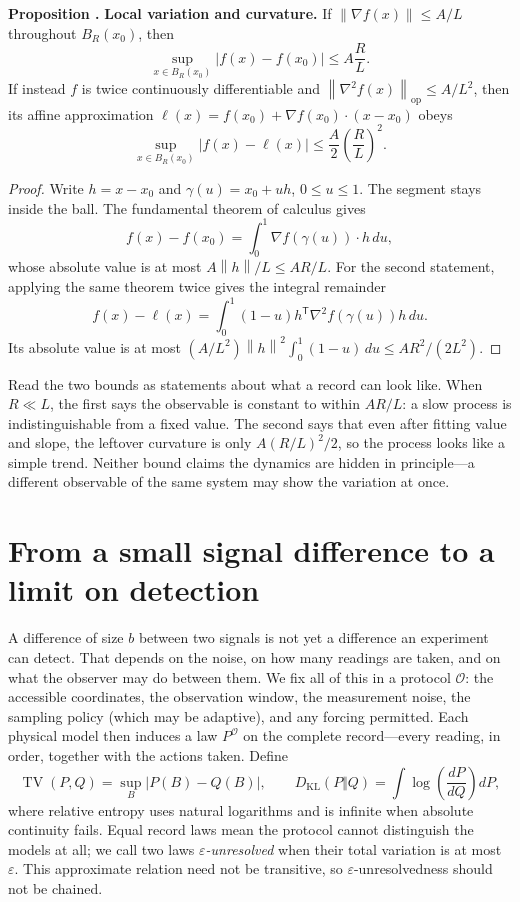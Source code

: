 \documentclass[10pt]{article}
\newcounter{claim}
\newcommand{\claim}[2]{\refstepcounter{claim}\label{#1}\textbf{#2 \theclaim.}}
\newcommand{\TV}{\operatorname{TV}}
\newcommand{\KL}{D_{\mathrm{KL}}}
\newcommand{\eps}{\varepsilon}
\newcommand{\obs}{\mathcal O}
\newcommand{\norm}[1]{\left\lVert#1\right\rVert}
\begin{document}
\begin{resultbox}
\claim{prop:geometry}{Proposition} \textbf{Local variation and curvature.}
If $\norm{\nabla f(x)}\leq A/L$ throughout $B_R(x_0)$, then
\begin{equation}
\sup_{x\in B_R(x_0)}|f(x)-f(x_0)|\leq A\frac RL.
\label{eq:gradient}
\end{equation}
If instead $f$ is twice continuously differentiable and
$\norm{\nabla^2 f(x)}_{\mathrm{op}}\leq A/L^2$, then its affine approximation
$\ell(x)=f(x_0)+\nabla f(x_0)\cdot(x-x_0)$ obeys
\begin{equation}
\sup_{x\in B_R(x_0)}|f(x)-\ell(x)|\leq\frac A2\left(\frac RL\right)^2.
\label{eq:curvature}
\end{equation}
\end{resultbox}
\begin{proof}
Write $h=x-x_0$ and $\gamma(u)=x_0+uh$, $0\leq u\leq1$. The segment stays
inside the ball. The fundamental theorem of calculus gives
\[
f(x)-f(x_0)=\int_0^1\nabla f(\gamma(u))\cdot h\,du,
\]
whose absolute value is at most $A\norm h/L\leq AR/L$.
For the second statement, applying the same theorem twice gives the integral
remainder
\[
f(x)-\ell(x)=\int_0^1(1-u)h^{\mathsf T}\nabla^2 f(\gamma(u))h\,du.
\]
Its absolute value is at most
$(A/L^2)\norm h^2\int_0^1(1-u)\,du\leq AR^2/(2L^2)$.
\end{proof}

Read the two bounds as statements about what a record can look like. When
$R\ll L$, the first says the observable is constant to within $AR/L$: a slow
process is indistinguishable from a fixed value. The second says that even
after fitting value and slope, the leftover curvature is only $A(R/L)^2/2$, so
the process looks like a simple trend. Neither bound claims the dynamics are
hidden in principle---a different observable of the same system may show the
variation at once.

\section*{From a small signal difference to a limit on detection}
A difference of size $b$ between two signals is not yet a difference an
experiment can detect. That depends on the noise, on how many readings are
taken, and on what the observer may do between them. We fix all of this in a
protocol $\obs$: the accessible coordinates, the observation window, the
measurement noise, the sampling policy (which may be adaptive), and any forcing
permitted. Each physical model then induces a law $P^{\obs}$ on the complete
record---every reading, in order, together with the actions taken. Define
\[
\TV(P,Q)=\sup_B|P(B)-Q(B)|,
\qquad
\KL(P\Vert Q)=\int\log\!\left(\frac{dP}{dQ}\right)dP,
\]
where relative entropy uses natural logarithms and is infinite when absolute
continuity fails. Equal record laws mean the protocol cannot distinguish the
models at all; we call two laws \emph{$\eps$-unresolved} when their total
variation is at most $\eps$. This approximate relation need not be transitive,
so $\eps$-unresolvedness should not be chained.
\end{document}
